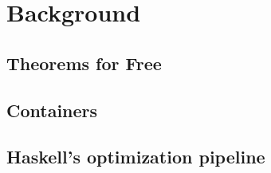 
\section{Background}



\subsection{Theorems for Free}\label{sec:free}
\iffalse
- Paremetricity
- Recent work with Agda --bridges
\fi
\subsection{Containers}
\iffalse
- Strictly positive functors
\fi
\subsection{Haskell's optimization pipeline}
\iffalse
- Tail call optimization
- Beta reduction
- Case of case
- Inlining
\fi